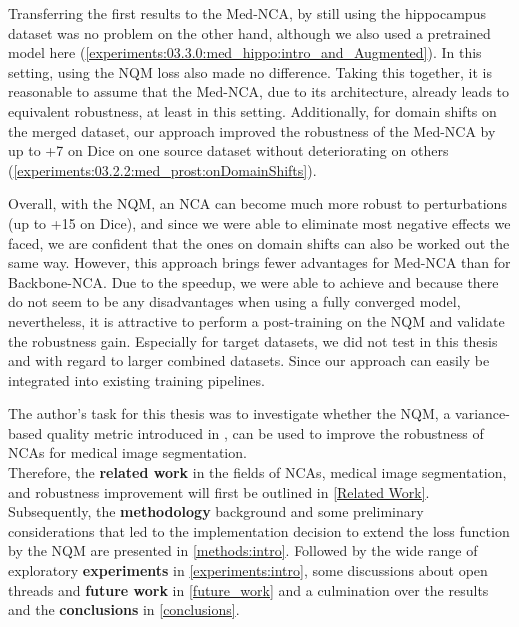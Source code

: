 Transferring the first results to the Med-NCA, by still using the hippocampus dataset was no problem on the other hand, although we also used a pretrained model here (\autoref{experiments:03.3.0:med_hippo:intro_and_Augmented}). In this setting, using the NQM loss also made no difference. Taking this together, it is reasonable to assume that the Med-NCA, due to its architecture, already leads to equivalent robustness, at least in this setting.
Additionally, for domain shifts on the merged dataset, our approach improved the robustness of the Med-NCA by up to +7 on Dice on one source dataset without deteriorating on others (\autoref{experiments:03.2.2:med_prost:onDomainShifts}).


Overall, with the NQM, an NCA can become much more robust to perturbations (up to +15 on Dice), and since we were able to eliminate most negative effects we faced,  we are confident that the ones on domain shifts can also be worked out the same way. However, this approach brings fewer advantages for Med-NCA than for Backbone-NCA. Due to the speedup, we were able to achieve and because there do not seem to be any disadvantages when using a fully converged model, nevertheless, it is attractive to perform a post-training on the NQM and validate the robustness gain. Especially for target datasets, we did not test in this thesis and with regard to larger combined datasets. Since our approach can easily be integrated into existing training pipelines.


The author's task for this thesis was to investigate whether the NQM, a variance-based quality metric introduced in \cite{kalkhof:2023:M3D-NCA}, can be used to improve the robustness of NCAs for medical image segmentation.\\
Therefore, the \textbf{related work} in the fields of NCAs, medical image segmentation, and robustness improvement will first be outlined in \autoref{Related Work}. Subsequently, the \textbf{methodology} background and some preliminary considerations that led to the implementation decision to extend the loss function by the NQM are presented in \autoref{methods:intro}. Followed by the wide range of exploratory \textbf{experiments} in \autoref{experiments:intro}, some discussions about open threads and \textbf{future work} in \autoref{future_work} and a culmination over the results and the \textbf{conclusions} in \autoref{conclusions}.